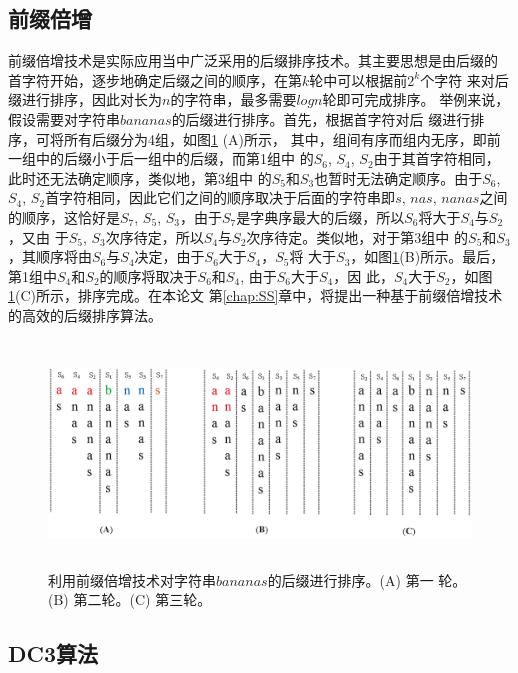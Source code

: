 \subsection{前缀倍增}

前缀倍增技术是实际应用当中广泛采用的后缀排序技术。其主要思想是由后缀的
首字符开始，逐步地确定后缀之间的顺序，在第$k$轮中可以根据前$2^k$个字符
来对后缀进行排序，因此对长为$n$的字符串，最多需要$logn$轮即可完成排序。
举例来说，假设需要对字符串$bananas$的后缀进行排序。首先，根据首字符对后
缀进行排序，可将所有后缀分为4组，如图\ref{fig:Prefix_Doubling} (A)所示，
其中，组间有序而组内无序，即前一组中的后缀小于后一组中的后缀，而第1组中
的$S_6$, $S_4$,
$S_2$由于其首字符相同，此时还无法确定顺序，类似地，第3组中
的$S_5$和$S_3$也暂时无法确定顺序。由于$S_6$, $S_4$,
$S_2$首字符相同，因此它们之间的顺序取决于后面的字符串即$s$, $nas$,
$nanas$之间的顺序，这恰好是$S_7$, $S_5$,
$S_3$，由于$S_7$是字典序最大的后缀，所以$S_6$将大于$S_4$与$S_2$，又由
于$S_5$,
$S_3$次序待定，所以$S_4$与$S_2$次序待定。类似地，对于第3组中
的$S_5$和$S_3$，其顺序将由$S_6$与$S_4$决定，由于$S_6$大于$S_4$，$S_5$将
大于$S_3$，如图\ref{fig:Prefix_Doubling}(B)所示。最后，
第1组中$S_4$和$S_2$的顺序将取决于$S_6$和$S_4$, 由于$S_6$大于$S_4$，因
此，$S_4
$大于$S_2$，如图\ref{fig:Prefix_Doubling}(C)所示，排序完成。在本论文
第\ref{chap:SS}章中，将提出一种基于前缀倍增技术的高效的后缀排序算法。

\begin{figure}[H]
  \centering
  \includegraphics[height=6cm ,width=15cm]{figures/1_Introduction/Prefix_Doubling.eps}
  \caption{利用前缀倍增技术对字符串$bananas$的后缀进行排序。(A) 第一
    轮。(B) 第二轮。(C) 第三轮。}
  \label{fig:Prefix_Doubling}
\end{figure}

\subsection{DC3算法}
\label{sec:KA}

